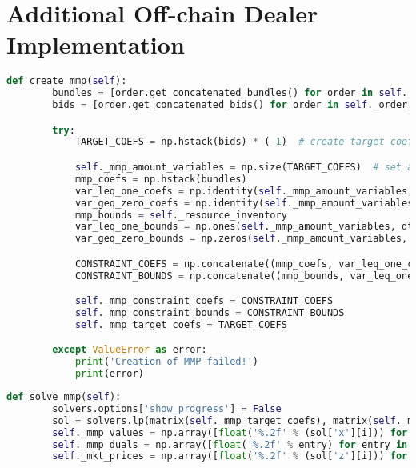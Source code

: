 \section{Additional Off-chain Dealer Implementation}
\label{appendix:additional_offchain}

\begin{lstlisting}[float=htbp, label=lst:creation_mmp, caption=Creation of MMP, language=Python]
    def create_mmp(self):
        bundles = [order.get_concatenated_bundles() for order in self._order_handler.get_all_orders()]
        bids = [order.get_concatenated_bids() for order in self._order_handler.get_all_orders()]

        try:
            TARGET_COEFS = np.hstack(bids) * (-1)  # create target coef vector

            self._mmp_amount_variables = np.size(TARGET_COEFS)  # set amount of variables
            mmp_coefs = np.hstack(bundles)
            var_leq_one_coefs = np.identity(self._mmp_amount_variables, dtype=float)  # create constraint matrix for y<=1
            var_geq_zero_coefs = np.identity(self._mmp_amount_variables, dtype=float) * (-1)  # create constraint matrix for y>=0
            mmp_bounds = self._resource_inventory
            var_leq_one_bounds = np.ones(self._mmp_amount_variables, dtype=float)
            var_geq_zero_bounds = np.zeros(self._mmp_amount_variables, dtype=float)

            CONSTRAINT_COEFS = np.concatenate((mmp_coefs, var_leq_one_coefs, var_geq_zero_coefs), axis=0)  # create final constraint matrix
            CONSTRAINT_BOUNDS = np.concatenate((mmp_bounds, var_leq_one_bounds, var_geq_zero_bounds))  # create final bounds matrix

            self._mmp_constraint_coefs = CONSTRAINT_COEFS
            self._mmp_constraint_bounds = CONSTRAINT_BOUNDS
            self._mmp_target_coefs = TARGET_COEFS

        except ValueError as error:
            print('Creation of MMP failed!')
            print(error)
\end{lstlisting}

\begin{lstlisting}[float=htbp, label=lst:solving_mmp, caption=Solving of MMP, language=Python]
    def solve_mmp(self):
        solvers.options['show_progress'] = False
        sol = solvers.lp(matrix(self._mmp_target_coefs), matrix(self._mmp_constraint_coefs), matrix(self._mmp_constraint_bounds))
        self._mmp_values = np.array([float('%.2f' % (sol['x'][i])) for i in range(self._mmp_amount_variables)])
        self._mmp_duals = np.array([float('%.2f' % entry) for entry in sol['z']])
        self._mkt_prices = np.array([float('%.2f' % (sol['z'][i])) for i in range(self._shared_resource_size)])
\end{lstlisting}

\clearpage